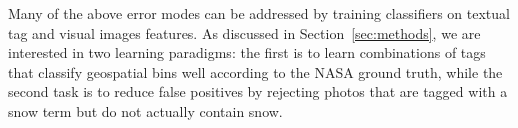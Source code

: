 
Many of the above error modes can be addressed by training classifiers
on textual tag and visual images features.
As discussed in Section~\ref{sec:methods}, we are
interested in two learning paradigms: the first is to learn
combinations of tags that classify geospatial bins well according to
the NASA ground truth, while the second task is to reduce false
positives by rejecting photos that are tagged with a snow term but do
not actually contain snow.  


